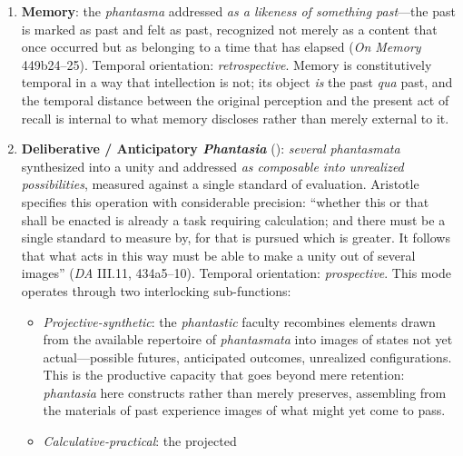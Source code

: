 \begin{itemize}
\begin{itemize}
\begin{itemize}
\begin{enumerate}
                  \item \textbf{Memory}: the \textit{phantasma} addressed \textit{as
                  a likeness of something past}---the past is marked as past and
                  felt as past, recognized not merely as a content that once occurred
                  but as belonging to a time that has elapsed (\textit{On Memory}
                  449b24--25). Temporal orientation: \textit{retrospective}. Memory is
                  constitutively temporal in a way that intellection is not; its object
                  \textit{is} the past \textit{qua} past, and the temporal distance
                  between the original perception and the present act of recall is
                  internal to what memory discloses rather than merely external to it.

                  \item \textbf{Deliberative / Anticipatory \textit{Phantasia}}
                  (): \textit{several} \textit{phantasmata}
                  synthesized into a unity and addressed \textit{as composable into
                  unrealized possibilities}, measured against a single standard of
                  evaluation. Aristotle specifies this operation with considerable
                  precision: ``whether this or that shall be enacted is already a task
                  requiring calculation; and there must be a single standard to measure
                  by, for that is pursued which is greater. It follows that what acts
                  in this way must be able to make a unity out of several images''
                  (\textit{DA} III.11, 434a5--10). Temporal orientation:
                  \textit{prospective}. This mode operates through two interlocking
                  sub-functions:
                  \begin{itemize}
                      \item \textit{Projective-synthetic}: the \textit{phantastic}
                      faculty recombines elements drawn from the available repertoire
                      of \textit{phantasmata} into images of states not yet
                      actual---possible futures, anticipated outcomes, unrealized
                      configurations. This is the productive capacity that goes beyond
                      mere retention: \textit{phantasia} here constructs rather than
                      merely preserves, assembling from the materials of past
                      experience images of what might yet come to pass.
                      \item \textit{Calculative-practical}: the projected

\end{itemize}
\end{enumerate}
\end{itemize}
\end{itemize}
\end{itemize}
